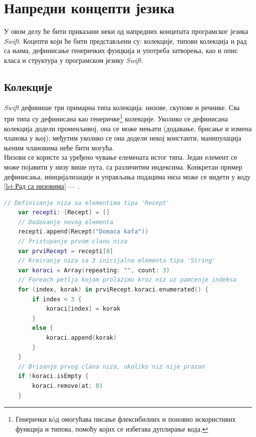 \documentclass[12pt,oneside]{memoir}
\begin{document}
\section{Напредни концепти језика}

\indent У овом делу ће бити приказани неки од напредних концепата програмског језика \textit{Swift}. Коцепти који ће бити представљени су: колекције, типови колекција и рад са њима, дефинисање генеричких фунцкија и употреба затворења, као и опис класа и структура у програмском језику \textit{Swift}.

\subsection{Колекције}
\label{subsec:Колекције}

\indent \textit{Swift} дефинише три примарна типа колекција: низове, скупове и речнике. Сва три типа су дефинисана као генеричке\footnote{Генерички к\^{o}д омогућава писање флексибилних и поновно искористивих функција и типова, помоћу којих се избегава дуплирање кода.} колекције. Уколико се дефинисана колекција додели променљивој, она се може мењати (додавање, брисање и измена чланова у њој); међутим уколико се она додели некој константи, манипулација њеним члановима неће бити могућа. \\
\indent Низови се користе за уређено чување елемената истог типа. Један елемент се може појавити у низу више пута, са различитим индексима. Конкретан пример дефинисања, иницијализације и управљања подацима низа може се видети у коду \ref{lst:Рад са низовима} --- .

\begin{lstlisting}[caption=\textit{{Рад са низовима}}, label={lst:Рад са низовима}, language=Swift, frame=single]
    // Definisanje niza sa elementima tipa 'Recept'
    var recepti: [Recept] = []
    // Dodavanje novog elementa
    recepti.append(Recept("Domaca kafa"))
    // Pristupanje prvom clanu niza
    var prviRecept = recepti[0]
    // Kreiranje niza sa 3 inicijalna elementa tipa 'String'
    var koraci = Array(repeating: "", count: 3)
    // Foreach petlja kojom prolazimo kroz niz uz pamcenje indeksa
    for (index, korak) in prviRecept.koraci.enumerated() {
        if index < 3 {
            koraci[index] = korak
        }
        else {
            koraci.append(korak)
        }
    }
    // Brisanje prvog clana niza, ukoliko niz nije prazan
    if !koraci.isEmpty {
        koraci.remove(at: 0)
    }
\end{lstlisting}
\end{document}
